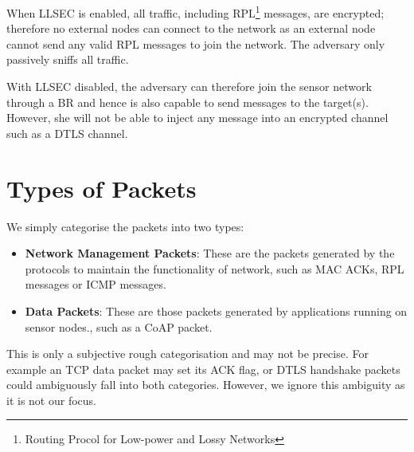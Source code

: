 When LLSEC is enabled, all traffic, including RPL\footnote{Routing Procol for Low-power and Lossy Networks} messages, are encrypted; therefore no external nodes can connect to the network as an external node cannot send any valid RPL messages to join the network. The adversary only passively sniffs all traffic.

With LLSEC disabled, the adversary can therefore join the sensor network through a BR and hence is also capable to send messages to the target(s). However, she will not be able to inject any message into an encrypted channel such as a DTLS channel.

\section{Types of Packets}
We simply categorise the packets into two types:
\begin{itemize}
\item {\bf Network Management Packets}: These are the packets generated by the protocols to  maintain the functionality of network, such as MAC ACKs, RPL messages or ICMP messages.
\item {\bf Data Packets}: These are those packets generated by applications running on sensor nodes., such as a CoAP packet.
\end{itemize}

This is only a subjective rough categorisation and may not be precise. For example an TCP data packet may set its ACK flag, or DTLS handshake packets could ambiguously fall into both categories. However, we ignore this ambiguity as it is not our focus.